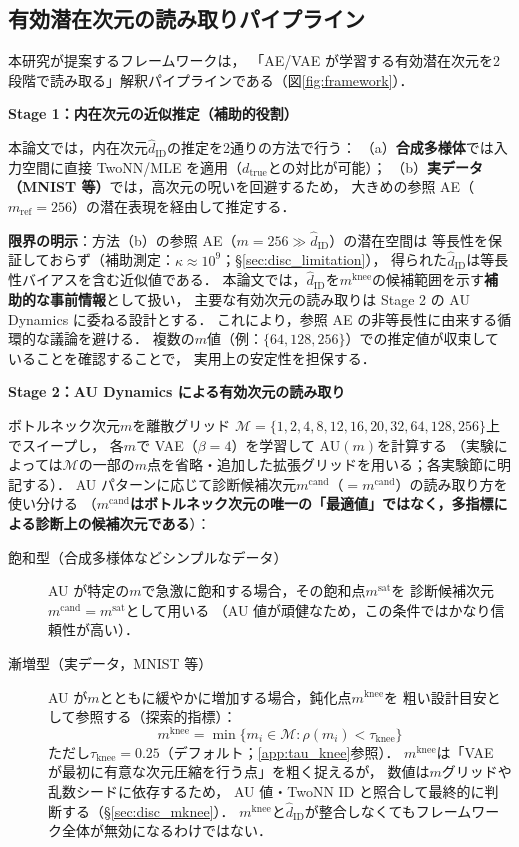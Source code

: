 \documentclass[11pt,a4paper]{jsarticle}
\newcommand{\dzopt}{m^{\mathrm{cand}}}
\newcommand{\dtrue}{d_{\mathrm{true}}}
\newcommand{\kap}{\kappa}
\newcommand{\dzsat}{m^{\mathrm{sat}}}
\newcommand{\mknee}{m^{\mathrm{knee}}}
\begin{document}
\subsection{有効潜在次元の読み取りパイプライン}\label{sec:framework_pipeline}

本研究が提案するフレームワークは，
「AE/VAE が学習する有効潜在次元を2段階で読み取る」解釈パイプラインである（図\ref{fig:framework}）．

\textbf{Stage 1：内在次元の近似推定（補助的役割）}

本論文では，内在次元$\hat{d}_\mathrm{ID}$の推定を2通りの方法で行う：
（a）\textbf{合成多様体}では入力空間に直接 TwoNN/MLE を適用（$\dtrue$との対比が可能）；
（b）\textbf{実データ（MNIST 等）}では，高次元の呪いを回避するため，
大きめの参照 AE（$m_{\mathrm{ref}} = 256$）の潜在表現を経由して推定する．

\textbf{限界の明示}：方法（b）の参照 AE（$m = 256 \gg \hat{d}_\mathrm{ID}$）の潜在空間は
等長性を保証しておらず（補助測定：$\kap \approx 10^9$；§\ref{sec:disc_limitation}），
得られた$\hat{d}_\mathrm{ID}$は等長性バイアスを含む近似値である．
本論文では，$\hat{d}_\mathrm{ID}$を$\mknee$の候補範囲を示す\textbf{補助的な事前情報}として扱い，
主要な有効次元の読み取りは Stage 2 の AU Dynamics に委ねる設計とする．
これにより，参照 AE の非等長性に由来する循環的な議論を避ける．
複数の$m$値（例：$\{64, 128, 256\}$）での推定値が収束していることを確認することで，
実用上の安定性を担保する．

\textbf{Stage 2：AU Dynamics による有効次元の読み取り}

ボトルネック次元$m$を離散グリッド
$\mathcal{M} = \{1, 2, 4, 8, 12, 16, 20, 32, 64, 128, 256\}$上でスイープし，
各$m$で VAE（$\beta = 4$）を学習して AU$(m)$を計算する
（実験によっては$\mathcal{M}$の一部の$m$点を省略・追加した拡張グリッドを用いる；各実験節に明記する）．
AU パターンに応じて診断候補次元$\dzopt$（$= m^{\mathrm{cand}}$）の読み取り方を使い分ける
（\textbf{$\dzopt$はボトルネック次元の唯一の「最適値」ではなく，多指標による診断上の候補次元である}）：

\begin{description}
  \item[飽和型（合成多様体などシンプルなデータ）]
        AU が特定の$m$で急激に飽和する場合，その飽和点$\dzsat$を
        診断候補次元$\dzopt = \dzsat$として用いる
        （AU 値が頑健なため，この条件ではかなり信頼性が高い）．
  \item[漸増型（実データ，MNIST 等）]
        AU が$m$とともに緩やかに増加する場合，鈍化点$\mknee$を
        粗い設計目安として参照する（探索的指標）：
        \begin{equation}
          \mknee = \min\{m_i \in \mathcal{M} : \rho(m_i) < \tau_{\mathrm{knee}}\}
          \label{eq:mknee}
        \end{equation}
        ただし$\tau_{\mathrm{knee}} = 0.25$（デフォルト；\ref{app:tau_knee}参照）．
        $\mknee$は「VAE が最初に有意な次元圧縮を行う点」を粗く捉えるが，
        数値は$m$グリッドや乱数シードに依存するため，
        AU 値・TwoNN ID と照合して最終的に判断する（§\ref{sec:disc_mknee}）．
        $\mknee$と$\hat{d}_\mathrm{ID}$が整合しなくてもフレームワーク全体が無効になるわけではない．
\end{description}
\end{document}
